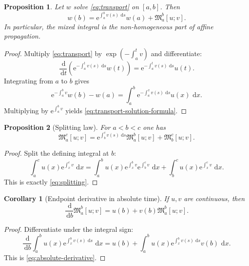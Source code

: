 \documentclass[11pt]{article}
\newtheorem{proposition}{Proposition}
\newtheorem{corollary}{Corollary}
\newcommand{\maint}[2]{\mathfrak{M}_{#1}^{#2}}
\newcommand{\dd}{\,\mathrm{d}}
\newcommand{\ee}{\mathrm{e}}
\begin{document}
\begin{proposition}
\label{prop:transport-solution}
Let $w$ solve \eqref{eq:transport} on $[a,b]$. Then
\begin{equation}
\label{eq:transport-solution-formula}
w(b)=\ee^{\int_a^b v(s)\,\dd s}w(a)+\maint{a}{b}[u;v].
\end{equation}
In particular, the mixed integral is the non-homogeneous part of affine propagation.
\end{proposition}

\begin{proof}
Multiply \eqref{eq:transport} by $\exp(-\int_a^t v)$ and differentiate:
\[
\frac{\dd}{\dd t}\left(\ee^{-\int_a^t v(s)\,\dd s}w(t)\right)
=
\ee^{-\int_a^t v(s)\,\dd s}u(t).
\]
Integrating from $a$ to $b$ gives
\[
\ee^{-\int_a^b v}w(b)-w(a)
=
\int_a^b \ee^{-\int_a^x v(s)\,\dd s}u(x)\,\dd x.
\]
Multiplying by $\ee^{\int_a^b v}$ yields \eqref{eq:transport-solution-formula}.
\end{proof}

\begin{proposition}[Splitting law]
\label{prop:splitting}
For $a<b<c$ one has
\begin{equation}
\label{eq:splitting}
\maint{a}{c}[u;v]
=
\ee^{\int_b^c v(s)\,\dd s}\maint{a}{b}[u;v]
+
\maint{b}{c}[u;v].
\end{equation}
\end{proposition}

\begin{proof}
Split the defining integral at $b$:
\[
\int_a^c u(x)\ee^{\int_x^c v}\,\dd x
=
\int_a^b u(x)\ee^{\int_x^b v}\ee^{\int_b^c v}\,\dd x
+
\int_b^c u(x)\ee^{\int_x^c v}\,\dd x.
\]
This is exactly \eqref{eq:splitting}.
\end{proof}

\begin{corollary}[Endpoint derivative in absolute time]
\label{cor:absolute-derivative}
If $u,v$ are continuous, then
\begin{equation}
\label{eq:absolute-derivative}
\frac{\dd}{\dd b}\maint{a}{b}[u;v]
=
 u(b)+v(b)\maint{a}{b}[u;v].
\end{equation}
\end{corollary}

\begin{proof}
Differentiate under the integral sign:
\[
\frac{\dd}{\dd b}\int_a^b u(x)\ee^{\int_x^b v(s)\,\dd s}\,\dd x
=
 u(b)+\int_a^b u(x)\ee^{\int_x^b v(s)\,\dd s}v(b)\,\dd x.
\]
This is \eqref{eq:absolute-derivative}.
\end{proof}
\end{document}

